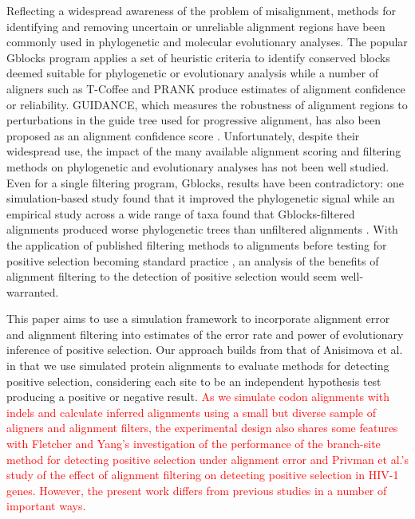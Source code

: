 \documentclass{article}
\begin{document}
Reflecting a widespread awareness of the problem of misalignment,
methods for identifying and removing uncertain or unreliable alignment
regions have been commonly used in phylogenetic and molecular
evolutionary analyses. The popular Gblocks program applies a set of
heuristic criteria to identify conserved blocks deemed suitable for
phylogenetic or evolutionary analysis \citep{Castresana2000Selection}
while a number of aligners such as T-Coffee
\citep{Notredame2000TCoffee} and PRANK
\citep{Loytynoja2008PhylogenyAware} produce estimates of alignment
confidence or reliability. GUIDANCE, which measures the robustness of
alignment regions to perturbations in the guide tree used for
progressive alignment, has also been proposed as an alignment
confidence score \citep{Penn2010Alignment}. Unfortunately, despite
their widespread use, the impact of the many available alignment
scoring and filtering methods on phylogenetic and evolutionary
analyses has not been well studied. Even for a single filtering
program, Gblocks, results have been contradictory: one
simulation-based study found that it improved the phylogenetic signal
\citep{Talavera2007Improvement} while an empirical study across a wide
range of taxa found that Gblocks-filtered alignments produced worse
phylogenetic trees than unfiltered alignments
\citep{Dessimoz2010Phylogenetic}. With the application of published
filtering methods to alignments before testing for positive selection
becoming standard practice
\citep{Studer2008Pervasive,Aguileta2009Rapidly}, an analysis of the
benefits of alignment filtering to the detection of positive selection
would seem well-warranted.

This paper aims to use a simulation framework to incorporate alignment
error and alignment filtering into estimates of the error rate and
power of \sw evolutionary inference of positive selection. Our
approach builds from that of Anisimova et al.
\citeyearpar{Anisimova2002Accuracy} in that we use simulated protein
alignments to evaluate methods for detecting \sw positive selection,
considering each site to be an independent hypothesis test producing a
positive or negative result. \textcolor{red}{As we simulate codon
  alignments with indels and calculate inferred alignments using a
  small but diverse sample of aligners and alignment filters, the
  experimental design also shares some features with Fletcher and
  Yang's \citeyearpar{Fletcher2010Effect} investigation of the
  performance of the branch-site method for detecting positive
  selection under alignment error and Privman et al.'s
  \citeyearpar{Privman2011Improving} study of the effect of alignment
  filtering on detecting positive selection in HIV-1 genes. However,
  the present work differs from previous studies in a number of
  important ways.}
\end{document}

